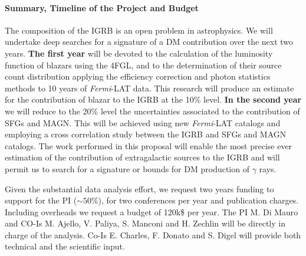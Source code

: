 \documentclass[12 pt]{article}
\newcommand{\FIXME}[1]{{\color{red}{\em Comment: }{#1}}}
\begin{document}
\paragraph{Summary, Timeline of the Project and Budget}
The composition of the IGRB is an open problem in astrophysics.   
We will undertake deep searches for a signature of a DM contribution over the next two years.
{\bf The first year} will be devoted to the calculation of the luminosity function of blazars using the 4FGL, and to the determination of their source count distribution applying the efficiency correction and photon statistics methods to 10 years of {\it Fermi}-LAT data.  
This research will produce an estimate for the contribution of blazar to the IGRB at the 10\% level.
{\bf In the second year} we will reduce to the 20\% level the uncertainties associated to the contribution of SFGs and MAGN. This will be achieved using new {\it Fermi}-LAT catalogs and employing a cross correlation study between the IGRB and SFGs and MAGN catalogs.
The work performed in this proposal will enable the most precise ever estimation of the contribution of extragalactic sources to the IGRB and will permit us to search for a signature or bounds for DM production of $\gamma$ rays.

Given the substantial data analysis effort, we request two years funding to support for the PI ($\sim 50\%$), for two conferences per year and publication charges. Including overheads we request a budget of 120k\$ per year. 
The PI M. Di Mauro and CO-Is M. Ajello, V. Paliya, S. Manconi and H. Zechlin will be directly in charge of the analysis.%
Co-Is E. Charles, F. Donato and S. Digel will provide both technical and the scientific input.



\vspace{-0.0cm}
{\footnotesize
\begin{multicols}{2}


\end{multicols}}
\end{document}

